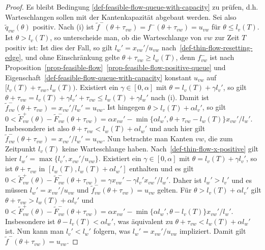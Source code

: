 \begin{proof}
	Es bleibt Bedingung \ref{def-feasible-flow-queue-with-capacity} zu prüfen, d.h. Warteschlangen sollen mit der Kantenkapazität abgebaut werden.
	Sei also $\tilde{q}_{vw}(\theta)$ positiv.
	Nach (i) ist $\tilde{f}^-(\theta + \tau_{vw}) = f^-(\theta + \tau_{vw}) = u_{vw}$ für $\theta\leq l_v(T)$.
	Ist $\theta > l_v(T)$, so unterscheide man, ob die Warteschlange von $vw$ zur Zeit $T$ positiv ist:
	Ist dies der Fall, so gilt $l_w' = x_{vw}' / u_{vw}$ nach~\ref{def-thin-flow-resetting-edge}, und ohne Einschränkung gelte $\theta + \tau_{vw} \geq l_w(T)$, denn $f_{vw}^-$ ist nach Proposition~\ref{prop-feasible-flow}~\ref{prop-feasible-flow-positive-queue} und Eigenschaft~\ref{def-feasible-flow-queue-with-capacity} konstant $u_{vw}$ auf $[l_v(T)+\tau_{vw},l_w(T))$.
	Existiert ein $\gamma\in [0, \alpha]$ mit $\theta = l_v(T) + \gamma l_v'$, so gilt $\theta + \tau_{vw} = l_v(T) + \gamma l_v' + \tau_{vw} \leq l_w(T) + \gamma l_w'$ nach (i).
	Damit ist $\tilde{f}^-_{vw}(\theta + \tau_{vw}) = x_{vw}'/l_w' = u_{vw}$.
	Ist  hingegen $\theta > l_v(T) + \alpha l_v'$, so gilt $0<\tilde{F}^+_{vw}(\theta) - \tilde{F}_{vw}^-(\theta +\tau_{vw}) = \alpha x_{vw}' - \min \{ \alpha l_w', \theta + \tau_{vw} - l_w(T) \} x_{vw}' / l_w'$. Insbesondere ist also $\theta + \tau_{vw} < l_w(T) + \alpha l_w'$ und auch hier gilt $\tilde{f}^-_{vw}(\theta + \tau_{vw}) = x_{vw}'/l_w' = u_{vw}$.	
	Nun betrachte man Kanten $vw$, die zum Zeitpunkt $l_v(T)$ keine Warteschlange haben.
	Nach~\ref{def-thin-flow-x-positive} gilt hier $l_w' = \max \{ l_v', x_{vw}' / u_{vw}  \}$.
	Existiert ein $\gamma\in [0, \alpha]$ mit $\theta = l_v(T) + \gamma l_v'$, so ist $\theta+\tau_{vw}$ in $[l_w(T), l_w(T) + \alpha l_w']$ enthalten und es gilt $0<\tilde{F}_{vw}^+(\theta) - \tilde{F}_{vw}^-(\theta + \tau_{vw})= \gamma x_{vw}' - \gamma l_v' x_{vw}'/l_w'$.
	Daher ist $l_w' > l_v'$ und es müssen $l_w' = x_{vw}'/u_{vw}$ und $\tilde{f}_{vw}^-(\theta + \tau_{vw}) = u_{vw}$ gelten.
	Für $\theta > l_v(T) + \alpha l_v'$ gilt $\theta + \tau_{vw} > l_w(T) + \alpha l_v'$ und $0 < \tilde{F}_{vw}^+(\theta) - \tilde{F}_{vw}^-(\theta + \tau_{vw}) = \alpha x_{vw}' - \min \{ \alpha l_w', \theta - l_v(T) \}x_{vw}'/l_w'$.
	Insbesondere ist $\theta - l_v(T) < \alpha l_w'$, was äquivalent zu $\theta + \tau_{vw} < l_w(T) + \alpha l_w'$ ist.
	Nun kann man $l_v' < l_w'$ folgern, was $l_w' = x_{vw}'/u_{vw}$ impliziert.
	Damit gilt $\tilde{f}^-(\theta + \tau_{vw}) = u_{vw}$.


\end{proof}
